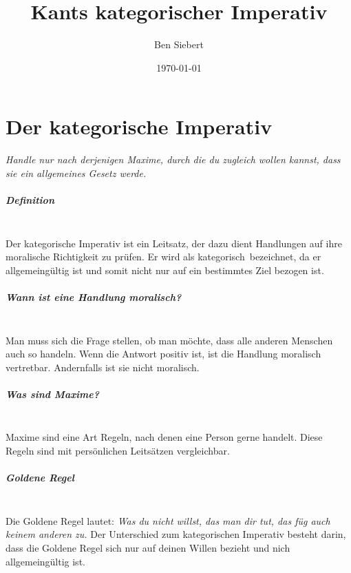 \documentclass[11pt, a4paper]{report}
\begin{document}
	\bsremovechaptertitle

	\title{Kants kategorischer Imperativ}
	\author{Ben Siebert}
	\date{\today}
	\maketitle
	\chapter{Der kategorische Imperativ}
	
	\textit{\dq
		Handle nur nach derjenigen Maxime, durch die du zugleich wollen kannst, dass sie ein allgemeines Gesetz werde.\dq}
	
	\paragraph{Definition} \mbox{} \\
	Der kategorische Imperativ ist ein Leitsatz, der dazu dient Handlungen auf ihre moralische Richtigkeit zu prüfen.
	Er wird als \dq kategorisch\dq\ bezeichnet, da er allgemeingültig ist und somit nicht nur auf ein bestimmtes Ziel bezogen ist.
	
	\paragraph{Wann ist eine Handlung moralisch?} \mbox{} \\
	Man muss sich die Frage stellen, ob man möchte, dass alle anderen Menschen auch so handeln.
	Wenn die Antwort positiv ist, ist die Handlung moralisch vertretbar.
	Andernfalls ist sie nicht moralisch. 
	
	\paragraph{Was sind Maxime?} \mbox{} \\
	Maxime sind eine Art Regeln, nach denen eine Person gerne handelt.
	Diese Regeln sind mit persönlichen Leitsätzen vergleichbar.
	
	\paragraph{Goldene Regel} \mbox{} \\
	Die Goldene Regel lautet:
	\textit{\dq Was du nicht willst, das man dir tut, das füg auch keinem anderen zu.\dq}
	Der Unterschied zum kategorischen Imperativ besteht darin, dass die Goldene Regel sich nur auf deinen Willen bezieht und nich allgemeingültig ist.
\end{document}
